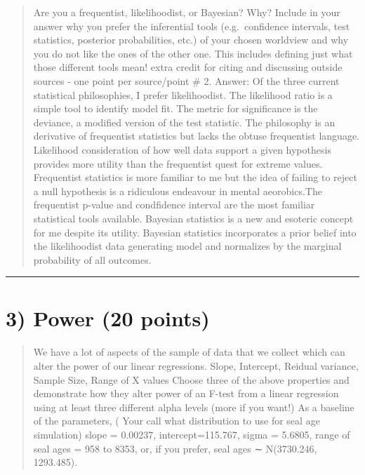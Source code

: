 \documentclass[]{article}
\begin{document}
\begin{quote}
Are you a frequentist, likelihoodist, or Bayesian? Why? Include in your
answer why you prefer the inferential tools (e.g.~confidence intervals,
test statistics, posterior probabilities, etc.) of your chosen worldview
and why you do not like the ones of the other one. This includes
defining just what those different tools mean! extra credit for citing
and discussing outside sources - one point per source/point \# 2.
Answer: Of the three current statistical philosophies, I prefer
likelihoodist. The likelihood ratio is a simple tool to identify model
fit. The metric for significance is the deviance, a modified version of
the test statistic. The philosophy is an derivative of frequentist
statistics but lacks the obtuse frequentist language. Likelihood
consideration of how well data support a given hypothesis provides more
utility than the frequentist quest for extreme values. Frequentist
statistics is more familiar to me but the idea of failing to reject a
null hypothesis is a ridiculous endeavour in mental aeorobics.The
frequentist p-value and condfidence interval are the most familiar
statistical tools available. Bayesian statistics is a new and esoteric
concept for me despite its utility. Bayesian statistics incorporates a
prior belief into the likelihoodist data generating model and normalizes
by the marginal probability of all outcomes.
\end{quote}

\begin{center}\rule{0.5\linewidth}{\linethickness}\end{center}

\section{3) Power (20 points)}\label{power-20-points}

\begin{quote}
We have a lot of aspects of the sample of data that we collect which can
alter the power of our linear regressions. Slope, Intercept, Reidual
variance, Sample Size, Range of X values Choose three of the above
properties and demonstrate how they alter power of an F-test from a
linear regression using at least three different alpha levels (more if
you want!) As a baseline of the parameters, ( Your call what
distribution to use for seal age simulation) slope = 0.00237,
intercept=115.767, sigma = 5.6805, range of seal ages = 958 to 8353, or,
if you prefer, seal ages ∼ N(3730.246, 1293.485).
\end{quote}
\end{document}
